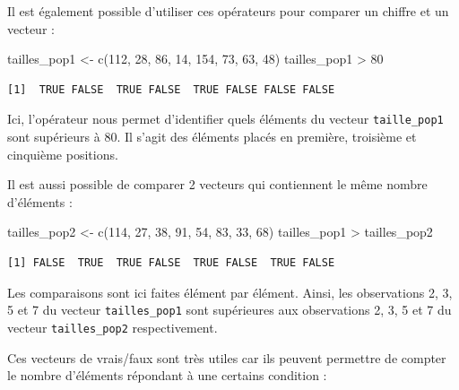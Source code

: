\documentclass[
  a4paper,
  DIV=11,
  numbers=noendperiod,
  oneside]{scrreprt}
\newenvironment{Shaded}{}{}
\newcommand{\DecValTok}[1]{\textcolor[rgb]{0.00,0.36,0.77}{#1}}
\newcommand{\FunctionTok}[1]{\textcolor[rgb]{0.44,0.26,0.76}{#1}}
\newcommand{\NormalTok}[1]{\textcolor[rgb]{0.14,0.16,0.18}{#1}}
\newcommand{\OtherTok}[1]{\textcolor[rgb]{0.44,0.26,0.76}{#1}}
\newcommand{\SpecialCharTok}[1]{\textcolor[rgb]{0.00,0.36,0.77}{#1}}
\begin{document}
Il est également possible d'utiliser ces opérateurs pour comparer un
chiffre et un vecteur :

\begin{Shaded}
\begin{Highlighting}[]
\NormalTok{tailles\_pop1 }\OtherTok{\textless{}{-}} \FunctionTok{c}\NormalTok{(}\DecValTok{112}\NormalTok{, }\DecValTok{28}\NormalTok{, }\DecValTok{86}\NormalTok{, }\DecValTok{14}\NormalTok{, }\DecValTok{154}\NormalTok{, }\DecValTok{73}\NormalTok{, }\DecValTok{63}\NormalTok{, }\DecValTok{48}\NormalTok{)}
\NormalTok{tailles\_pop1 }\SpecialCharTok{\textgreater{}} \DecValTok{80}
\end{Highlighting}
\end{Shaded}

\begin{verbatim}
[1]  TRUE FALSE  TRUE FALSE  TRUE FALSE FALSE FALSE
\end{verbatim}

Ici, l'opérateur nous permet d'identifier quels éléments du vecteur
\texttt{taille\_pop1} sont supérieurs à 80. Il s'agit des éléments
placés en première, troisième et cinquième positions.

Il est aussi possible de comparer 2 vecteurs qui contiennent le même
nombre d'éléments :

\begin{Shaded}
\begin{Highlighting}[]
\NormalTok{tailles\_pop2 }\OtherTok{\textless{}{-}} \FunctionTok{c}\NormalTok{(}\DecValTok{114}\NormalTok{, }\DecValTok{27}\NormalTok{, }\DecValTok{38}\NormalTok{, }\DecValTok{91}\NormalTok{, }\DecValTok{54}\NormalTok{, }\DecValTok{83}\NormalTok{, }\DecValTok{33}\NormalTok{, }\DecValTok{68}\NormalTok{)}
\NormalTok{tailles\_pop1 }\SpecialCharTok{\textgreater{}}\NormalTok{ tailles\_pop2}
\end{Highlighting}
\end{Shaded}

\begin{verbatim}
[1] FALSE  TRUE  TRUE FALSE  TRUE FALSE  TRUE FALSE
\end{verbatim}

Les comparaisons sont ici faites élément par élément. Ainsi, les
observations 2, 3, 5 et 7 du vecteur \texttt{tailles\_pop1} sont
supérieures aux observations 2, 3, 5 et 7 du vecteur
\texttt{tailles\_pop2} respectivement.

Ces vecteurs de vrais/faux sont très utiles car ils peuvent permettre de
compter le nombre d'éléments répondant à une certains condition :
\end{document}
